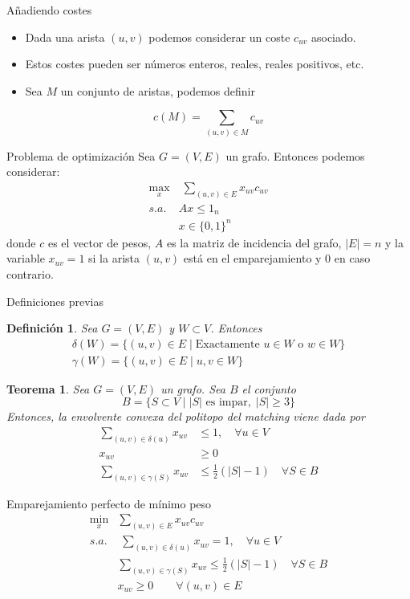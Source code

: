 \documentclass{beamer}
\newtheorem{defi}{Definici\'on}[section]
\newtheorem{thm}{Teorema}[section]
\begin{document}
\begin{frame}{Añadiendo costes}
\begin{itemize}
\item Dada una arista $(u,v)$ podemos considerar un coste $c_{uv}$ asociado. 
\item Estos costes pueden ser números enteros, reales, reales positivos, etc.
\item Sea $M$ un conjunto de aristas, podemos definir
\end{itemize}
$$
c(M) = \sum_{(u,v)\in M} c_{uv}
$$

\end{frame}
\begin{frame}{Problema de optimización}
Sea $G=(V,E)$ un grafo. Entonces podemos considerar:
\begin{align*}
\max_{x} &\; \sum_{(u,v)\in E} x_{uv}c_{uv}  \nonumber\\ 
s.a.\;  &  Ax\leq 1_n \\
& x\in\{0,1\}^n\nonumber
\end{align*}
donde $c$ es el vector de pesos, $A$ es la matriz de incidencia del grafo, $|E|=n$ y la variable $x_{uv}=1$ si la arista $(u,v)$ está en el emparejamiento y $0$ en caso contrario.
\end{frame}
\begin{frame}{Definiciones previas}
\begin{defi}
Sea $G=(V,E)$ y $W\subset V$. Entonces 
\begin{gather*}
\delta(W) = \{(u,v)\in E \mid \text{Exactamente $u \in W$ o $w \in W$} \}\\
\gamma(W) = \{(u,v)\in E \mid u,v \in W\}
\end{gather*}
\end{defi}
\end{frame}
\begin{frame}
\begin{thm}
Sea $G=(V,E)$ un grafo. Sea $B$ el conjunto
$$
B = \{S\subset V \mid |S| \text{ es impar},\;|S|\geq 3\}
$$
Entonces, la envolvente convexa del politopo del matching viene dada por
\begin{align*}
\sum_{(u,v)\in\delta(u)} x_{uv} &\leq 1, \quad \forall u\in V\\
x_{uv} &\geq 0\\
\sum_{(u,v)\in \gamma(S)} x_{uv}& \leq \frac{1}{2}(|S|-1)\quad \forall S \in B	
\end{align*}
\end{thm}
\end{frame}
\begin{frame}{Emparejamiento perfecto de mínimo peso}
\begin{align*}
\min_x & \sum_{(u,v) \in E}x_{uv}c_{uv}\\
s.a.&\;\sum_{(u,v)\in\delta(u)} x_{uv} = 1, \quad \forall u \in V\\
&\sum_{(u,v)\in \gamma(S)} x_{uv} \leq \frac{1}{2}(|S|-1)\quad \forall S \in B	\\
&x_{uv} \geq 0 \qquad \forall(u,v)\in E
\end{align*}
\end{frame}
\end{document}
